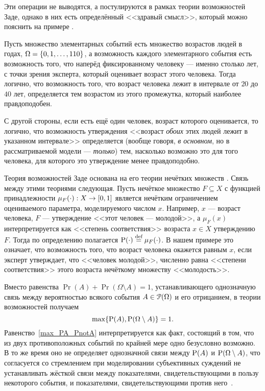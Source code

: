   Эти операции не выводятся, а постулируются в рамках теории возможностей Заде, однако в них есть определённый <<здравый смысл>>, который можно пояснить на примере \label{example_zadeh}.
\begin{example}
Пусть множество элементарных событий есть множество возрастов людей в годах, $\Om = \{0, 1, \ldots, 110\}$, а возможность каждого элементарного события есть возможность того, что наперёд фиксированному человеку --- именно столько лет, с точки зрения эксперта, который оценивает возраст этого человека.  Тогда логично, что возможность того, что возраст человека лежит в интервале от $20$ до $40$ лет, определяется тем возрастом из этого промежутка, который наиболее правдоподобен. 

С другой стороны, если есть ещё один человек, возраст которого оценивается, то логично, что возможность утверждения <<возраст {\sl обоих} этих людей лежит в указанном интервале>> определяется (вообще говоря, {\sl в основном}, но в рассматриваемой модели --- {\sl только}) тем, насколько возможно это для того человека, для которого это утверждение менее правдоподобно. 
\end{example}

\begin{notice}
Теория возможностей Заде основана на его теории нечётких множеств \cite{ZadehPrime}. Связь между этими теориями следующая. Пусть нечёткое множество $F \subseteq X$ с функцией принадлежности $\mu_{F}(\cdot): X \rightarrow \zo$ является нечётким ограничением \cite{citeZadeh} оцениваемого параметра, моделируемого числом $x$. Например, $x$ --- возраст человека, $F$ --- утверждение <<этот человек --- молодой>>, а $\mu_{F}(x)$ интерпретируется как <<степень соответствия>> возраста $x \in X$ утверждению $F$. Тогда по определению полагается $\P(\cdot) \defeq \mu_{F}(\cdot)$. В нашем примере это означает, что возможность того, что возраст человека окажется равным $x$, если эксперт утверждает, что <<человек молодой>>, численно равна <<степени соответствия>> этого возраста нечёткому множеству <<молодость>>. 
\end{notice}
\begin{notice}
Вместо равенства $\Pr(A) + \Pr(\Omega\setminus A) = 1$, устанавливающего однозначную связь между вероятностью всякого события $A\in\Po(\Omega)$ и его отрицанием, в теории возможностей получаем
\begin{equation}
\label{max_PA_PnotA}
    \max\{\P(A), \P(\Omega\setminus A)\} = 1.
\end{equation}
Равенство~\eqref{max_PA_PnotA} интерпретируется как факт, состоящий в том, что из двух противоположных событий по крайней мере одно безусловно возможно. В то же время оно не определяет однозначной связи между $\P(A)$ и $\P(\Omega\setminus A)$, что согласуется со стремлением при моделировании субъективных суждений не устанавливать жёсткой связи между показателями, свидетельствующими в пользу некоторого события, и показателями, свидетельствующими против него~\cite{dubois_prade-1990}.
\end{notice}

